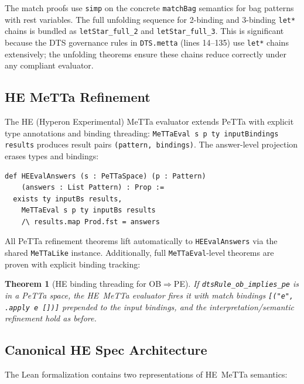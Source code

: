 \documentclass[]{article}
\newtheorem{theorem}{Theorem}
\newcommand{\code}[1]{\texttt{#1}}
\begin{document}
\noindent
The match proofs use \code{simp} on the concrete \code{matchBag} semantics
for bag patterns with rest variables.  The full unfolding sequence for
2-binding and 3-binding \code{let*} chains is bundled as
\code{letStar\_full\_2} and \code{letStar\_full\_3}.
This is significant because the DTS governance rules in
\code{DTS.metta} (lines 14--135) use \code{let*} chains extensively;
the unfolding theorems ensure these chains reduce correctly under
any compliant evaluator.

\subsection{HE MeTTa Refinement}

The HE (Hyperon Experimental) MeTTa evaluator extends PeTTa with explicit
type annotations and binding threading:
\code{MeTTaEval s p ty inputBindings results} produces result pairs
\code{(pattern, bindings)}.  The answer-level projection erases
types and bindings:

\begin{lstlisting}
def HEEvalAnswers (s : PeTTaSpace) (p : Pattern)
    (answers : List Pattern) : Prop :=
  exists ty inputBs results,
    MeTTaEval s p ty inputBs results
    /\ results.map Prod.fst = answers
\end{lstlisting}

\noindent
All PeTTa refinement theorems lift automatically to \code{HEEvalAnswers}
via the shared \code{MeTTaLike} instance.  Additionally, full
\code{MeTTaEval}-level theorems are proven with explicit binding tracking:

\begin{theorem}[HE binding threading for OB$\Rightarrow$PE]
If \code{dtsRule\_ob\_implies\_pe} is in a PeTTa space, the HE~MeTTa evaluator
fires it with match bindings \code{[("e", .apply e [])]} prepended to the
input bindings, and the interpretation/semantic refinement hold as before.
\end{theorem}

\subsection{Canonical HE Spec Architecture}

The Lean formalization contains two representations of HE~MeTTa semantics:
\end{document}
